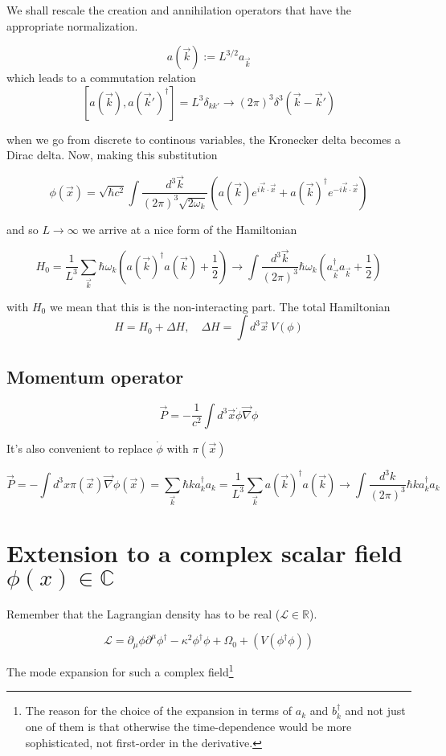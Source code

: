 \documentclass[11pt]{article}
\newcommand{\lag}{\mathcal{L}}
\begin{document}
	We shall rescale the creation and annihilation operators that have the appropriate normalization.
	
	\[ a(\vec{k}) := L^{3/2} a_{\vec{k}}\] which leads to a commutation relation \[ [a(\vec{k}), a(\vec{k}')^\dagger] = L^3 \delta_{k k'} \rightarrow (2\pi)^3 \delta^3(\vec{k}- \vec{k}')\]
	
	when we go from discrete to continous variables, the Kronecker delta becomes a Dirac delta. Now, making this substitution
	
	\[ \phi(\vec{x}) = \sqrt{\hbar c^2} \int \frac{d^3 \vec{k}}{(2\pi)^3 \sqrt{2 \omega_k}} \left(a(\vec{k}) e^{i\vec{k}\cdot \vec{x}} + a(\vec{k})^\dagger e^{-i\vec{k}\cdot \vec{x}}\right)\]
	
	and so $L\rightarrow\infty$ we arrive at a nice form of the Hamiltonian
	
	\[ H_0 = \frac{1}{L^3} \sum_{\vec{k}} \hbar \omega_k \left( a(\vec{k})^\dagger a(\vec{k}) + \frac{1}{2}\right) \rightarrow \int\frac{d^3\vec{k}}{(2\pi)^3} \hbar \omega_k (a_{\vec{k}}^\dagger a_{\vec{k}} + \frac{1}{2}) \]
	
	with $H_0$ we mean that this is the non-interacting part. The total Hamiltonian \[ H= H_0 + \Delta H, \quad \Delta H = \int d^3 \vec{x}\ V(\phi) \]
	
	
	\subsection*{Momentum operator}
	
	\[ \vec{P} = -\frac{1}{c^2} \int d^3 \vec{x} \dot{\phi} \vec{\nabla} \phi\]

It's also convenient to replace $\dot{\phi}$ with $\pi(\vec{x})$

	\[ \vec{P} = -\int d^3 x \pi(\vec{x}) \vec{\nabla}\phi(\vec{x}) = \sum_{\vec{k}} \hbar k a_k^\dagger a_k  = \frac{1}{L^3} \sum_{\vec{k}} a(\vec{k})^\dagger a(\vec{k}) \rightarrow \int \frac{d^3 k}{(2\pi)^3} \hbar k a_k^\dagger a_k \]
	
		
	\section*{Extension to a complex scalar field $\phi(x) \in \mathbb{C}$}
	Remember that the Lagrangian density has to be real ($\lag \in \mathbb{R}$).
	
	\[ \lag = \partial_\mu \phi \partial^\mu \phi^\dagger - \kappa^2 \phi^\dagger\phi + \Omega_0 + ( V(\phi^\dagger \phi))\]
	
	The mode expansion for such a complex field\footnote{The reason for the choice of the expansion in terms of $a_k$ and $b_k^\dagger$ and not just one of them is that otherwise the time-dependence would be more sophisticated, not first-order in the derivative.}
	
\end{document}
